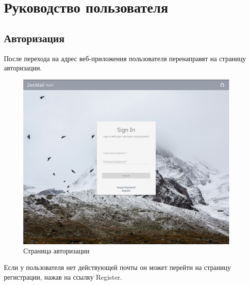 \documentclass{article}
\begin{document}
\section{Руководство пользователя}

\subsection{Авторизация}
После перехода на адрес веб-приложения пользователя перенаправят на страницу авторизации.
\begin{figure}[H]
        \begin{flushleft}
            \centerline{\includegraphics[scale=0.6]{loginscreen.png}}
            \caption{Страница авторизации}
        \end{flushleft}
\end{figure}

Если у пользователя нет действующей почты он может перейти на страницу регистрации, нажав на ссылку Register.
\end{document}
